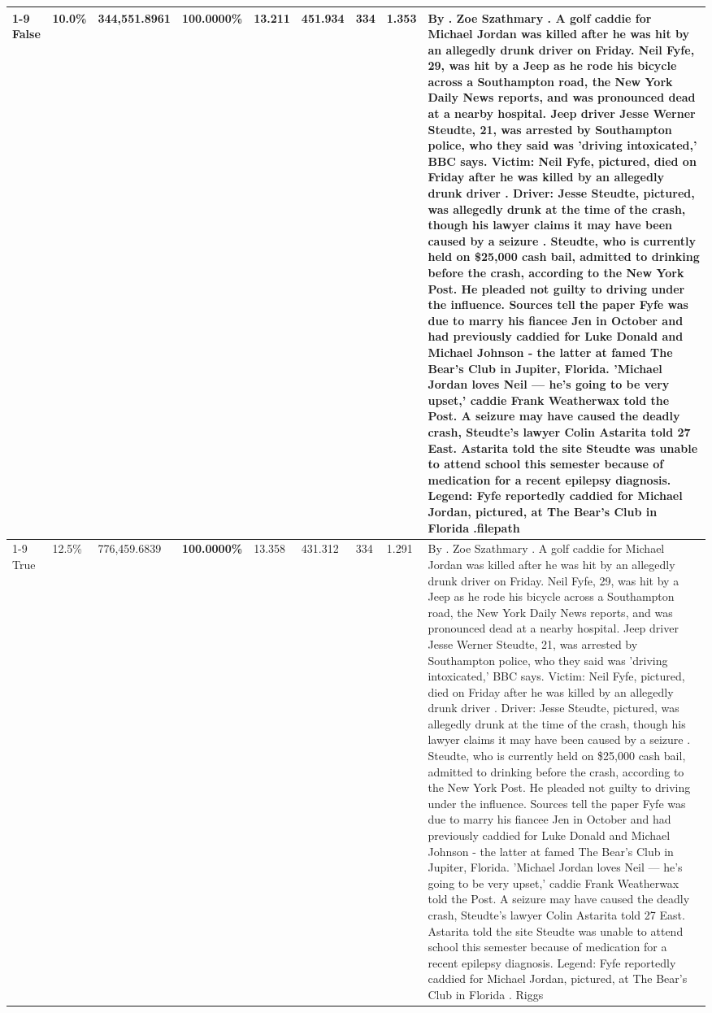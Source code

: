 \begin{table}[H]
\begin{tabular}{lllrlllll}
\cline{1-9}
False & 10.0\% & 344,551.8961 & \bfseries \color{red} 100.0000\% & 13.211 & 451.934 & 334 & 1.353 & By . Zoe Szathmary . A golf caddie for Michael Jordan was killed after he was hit by an allegedly drunk driver on Friday. Neil Fyfe, 29, was hit by a Jeep as he rode his bicycle across a Southampton road, the New York Daily News reports, and was pronounced dead at a nearby hospital. Jeep driver Jesse Werner Steudte, 21, was arrested by Southampton police, who they said was 'driving intoxicated,' BBC says. Victim: Neil Fyfe, pictured, died on Friday after he was killed by an allegedly drunk driver . Driver: Jesse Steudte, pictured, was allegedly drunk at the time of the crash, though his lawyer claims it may have been caused by a seizure . Steudte, who is currently held on \$25,000 cash bail, admitted to drinking before the crash, according to the New York Post. He pleaded not guilty to driving under the influence. Sources tell the paper Fyfe was due to marry his fiancee Jen in October and had previously caddied for Luke Donald and Michael Johnson - the latter at famed The Bear's Club in Jupiter, Florida. 'Michael Jordan loves Neil — he’s going to be very upset,' caddie Frank Weatherwax told the Post. A seizure may have caused the deadly crash, Steudte's lawyer Colin Astarita told 27 East. Astarita told the site Steudte was unable to attend school this semester because of medication for a recent epilepsy diagnosis. Legend: Fyfe reportedly caddied for Michael Jordan, pictured, at The Bear's Club in Florida .filepath \\
\cline{1-9}
True & 12.5\% & 776,459.6839 & \bfseries \color{red} 100.0000\% & 13.358 & 431.312 & 334 & 1.291 & By . Zoe Szathmary . A golf caddie for Michael Jordan was killed after he was hit by an allegedly drunk driver on Friday. Neil Fyfe, 29, was hit by a Jeep as he rode his bicycle across a Southampton road, the New York Daily News reports, and was pronounced dead at a nearby hospital. Jeep driver Jesse Werner Steudte, 21, was arrested by Southampton police, who they said was 'driving intoxicated,' BBC says. Victim: Neil Fyfe, pictured, died on Friday after he was killed by an allegedly drunk driver . Driver: Jesse Steudte, pictured, was allegedly drunk at the time of the crash, though his lawyer claims it may have been caused by a seizure . Steudte, who is currently held on \$25,000 cash bail, admitted to drinking before the crash, according to the New York Post. He pleaded not guilty to driving under the influence. Sources tell the paper Fyfe was due to marry his fiancee Jen in October and had previously caddied for Luke Donald and Michael Johnson - the latter at famed The Bear's Club in Jupiter, Florida. 'Michael Jordan loves Neil — he’s going to be very upset,' caddie Frank Weatherwax told the Post. A seizure may have caused the deadly crash, Steudte's lawyer Colin Astarita told 27 East. Astarita told the site Steudte was unable to attend school this semester because of medication for a recent epilepsy diagnosis. Legend: Fyfe reportedly caddied for Michael Jordan, pictured, at The Bear's Club in Florida . Riggs \\

\end{tabular}
\end{table}
